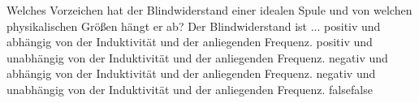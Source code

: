     {Welches Vorzeichen hat der Blindwiderstand einer idealen Spule und von welchen physikalischen Größen hängt er ab? Der Blindwiderstand ist ...}
    {positiv und abhängig von der Induktivität und der anliegenden Frequenz.}
    {positiv und unabhängig von der Induktivität und der anliegenden Frequenz.}
    {negativ und abhängig von der Induktivität und der anliegenden Frequenz.}
    {negativ und unabhängig von der Induktivität und der anliegenden Frequenz.}
    {false}{false}